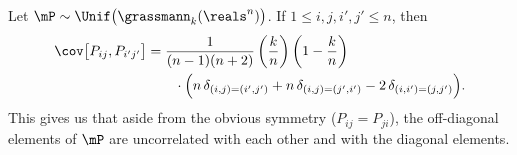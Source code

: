\begin{lemma}\label{L:grassman-moments-2}
    Let $\mP \sim \Unif \big( \grassmann_k(\reals^n) \big)$.  If
    $1 \leq i,j,i',j' \leq n$, then
    \begin{equation*}
        \begin{split}
            \cov \big[ P_{ij}, P_{i'j'} \big]
                &=
                    \frac{1}{(n-1)(n+2)}
                    \left(
                        \frac{k}{n}
                    \right)
                    \left(
                        1 - \frac{k}{n}
                    \right) \\
                &\qquad\cdot
                    \Big(
                          n \, \delta_{(i,j ) = (i',j')}
                        + n \, \delta_{(i,j ) = (j',i')}
                        - 2 \, \delta_{(i,i') = (j ,j')}
                    \Big).
        \end{split}
    \end{equation*}
    This gives us that aside from the obvious symmetry ($P_{ij} = P_{ji}$), 
    the off-diagonal elements of $\mP$ are uncorrelated with each other and 
    with the diagonal elements.
\end{lemma}
